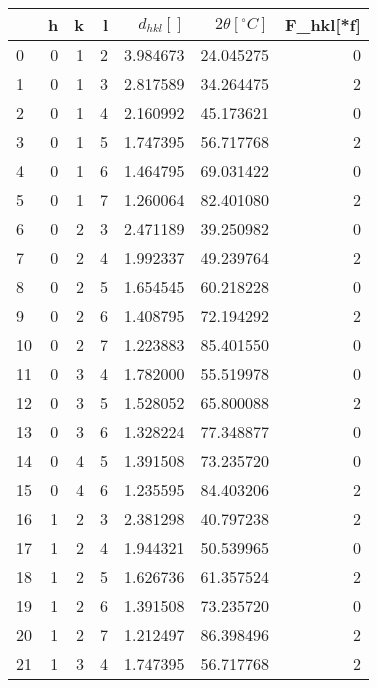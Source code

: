 \begin{tabular}{lrrrrrr}
\toprule
{} &  h &  k &  l &  $d_{hkl}[]$ &  $2\theta[^\circ C]$ &  F_{hkl}[*f] \\
\midrule
0  &  0 &  1 &  2 &     3.984673 &            24.045275 &            0 \\
1  &  0 &  1 &  3 &     2.817589 &            34.264475 &            2 \\
2  &  0 &  1 &  4 &     2.160992 &            45.173621 &            0 \\
3  &  0 &  1 &  5 &     1.747395 &            56.717768 &            2 \\
4  &  0 &  1 &  6 &     1.464795 &            69.031422 &            0 \\
5  &  0 &  1 &  7 &     1.260064 &            82.401080 &            2 \\
6  &  0 &  2 &  3 &     2.471189 &            39.250982 &            0 \\
7  &  0 &  2 &  4 &     1.992337 &            49.239764 &            2 \\
8  &  0 &  2 &  5 &     1.654545 &            60.218228 &            0 \\
9  &  0 &  2 &  6 &     1.408795 &            72.194292 &            2 \\
10 &  0 &  2 &  7 &     1.223883 &            85.401550 &            0 \\
11 &  0 &  3 &  4 &     1.782000 &            55.519978 &            0 \\
12 &  0 &  3 &  5 &     1.528052 &            65.800088 &            2 \\
13 &  0 &  3 &  6 &     1.328224 &            77.348877 &            0 \\
14 &  0 &  4 &  5 &     1.391508 &            73.235720 &            0 \\
15 &  0 &  4 &  6 &     1.235595 &            84.403206 &            2 \\
16 &  1 &  2 &  3 &     2.381298 &            40.797238 &            2 \\
17 &  1 &  2 &  4 &     1.944321 &            50.539965 &            0 \\
18 &  1 &  2 &  5 &     1.626736 &            61.357524 &            2 \\
19 &  1 &  2 &  6 &     1.391508 &            73.235720 &            0 \\
20 &  1 &  2 &  7 &     1.212497 &            86.398496 &            2 \\
21 &  1 &  3 &  4 &     1.747395 &            56.717768 &            2 \\

\end{tabular}
